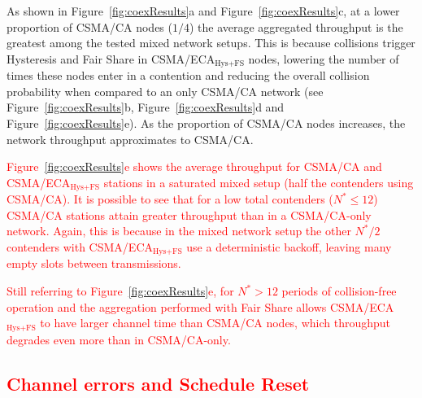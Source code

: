 	As shown in Figure~\ref{fig:coexResults}a and Figure~\ref{fig:coexResults}c, at a lower proportion of CSMA/CA nodes ($1/4$) the average aggregated throughput is the greatest among the tested mixed network setups. This is because collisions trigger Hysteresis and Fair Share in CSMA/ECA$_{\text{Hys+FS}}$ nodes, lowering the number of times these nodes enter in a contention and reducing the overall collision probability when compared to an only CSMA/CA network (see Figure~\ref{fig:coexResults}b, Figure~\ref{fig:coexResults}d and Figure~\ref{fig:coexResults}e). As the proportion of CSMA/CA nodes increases, the network throughput approximates to CSMA/CA.
	
	\textcolor{red}{Figure~\ref{fig:coexResults}e shows the average throughput for CSMA/CA and CSMA/ECA$_{\text{Hys+FS}}$ stations in a saturated mixed setup (half the contenders using CSMA/CA). It is possible to see that for a low total contenders ($N^{*}\leq 12$) CSMA/CA stations attain greater throughput than in a CSMA/CA-only network. Again, this is because in the mixed network setup the other $N^{*}/2$ contenders with CSMA/ECA$_{\text{Hys+FS}}$ use a deterministic backoff, leaving many empty slots between transmissions.} 
	
	\textcolor{red}{Still referring to Figure~\ref{fig:coexResults}e, for $N^{*}>12$ periods of collision-free operation and the aggregation performed with Fair Share allows CSMA/ECA$_{\text{Hys+FS}}$ to have larger channel time than CSMA/CA nodes, which throughput degrades even more than in CSMA/CA-only.}
	
	
	
	\textcolor{red}{\subsection{Channel errors and Schedule Reset}\label{resultsSchedRest}}
	
